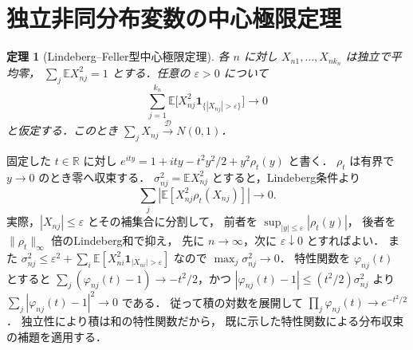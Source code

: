\documentclass[a5paper,10pt,onecolumn]{jsarticle}
\makeatletter
\theoremstyle{mathnotetheorem}
\newtheorem{theorem}{定理}[section]
\renewcommand{\proofname}{証明}
\renewenvironment{proof}[1][\proofname]{%
  \par\pushQED{\qed}\normalfont\topsep4\p@\@plus2\p@\relax
  \trivlist\item[\hskip\labelsep\bfseries #1]\ignorespaces
}{\popQED\endtrivlist\@endpefalse}
\newcommand{\norm}[1]{\lVert #1\rVert}
\makeatother
\begin{document}
\section{独立非同分布変数の中心極限定理}
\begin{theorem}[Lindeberg--Feller型中心極限定理]
各 $n$ に対し $X_{n1},\ldots,X_{nk_n}$ は独立で平均零，
$\sum_j\mathbb E X_{nj}^2=1$ とする．任意の $\varepsilon>0$ について
\[
 \sum_{j=1}^{k_n}\mathbb E\bigl[X_{nj}^2
 \mathbf1_{\{|X_{nj}|>\varepsilon\}}\bigr]
 \longrightarrow0
\]
と仮定する．このとき $\sum_jX_{nj}\xrightarrow{\mathcal D}N(0,1)$．
\end{theorem}
\begin{proof}
固定した $t\in\mathbb R$ に対し
$e^{ity}=1+ity-t^2y^2/2+y^2\rho_t(y)$ と書く．
$\rho_t$ は有界で $y\to0$ のとき零へ収束する．
$\sigma_{nj}^2=\mathbb E X_{nj}^2$ とすると，Lindeberg条件より
\[
 \sum_j\left|\mathbb E[X_{nj}^2\rho_t(X_{nj})]\right|\to0.
\]
実際，$|X_{nj}|\le\varepsilon$ とその補集合に分割して，
前者を $\sup_{|y|\le\varepsilon}|\rho_t(y)|$，
後者を $\norm{\rho_t}_\infty$ 倍のLindeberg和で抑え，
先に $n\to\infty$，次に $\varepsilon\downarrow0$ とすればよい．
また $\sigma_{nj}^2\le\varepsilon^2+
\sum_i\mathbb E[X_{ni}^2\mathbf1_{|X_{ni}|>\varepsilon}]$ なので
$\max_j\sigma_{nj}^2\to0$．
特性関数を $\varphi_{nj}(t)$ とすると
$\sum_j(\varphi_{nj}(t)-1)\to-t^2/2$，かつ
$|\varphi_{nj}(t)-1|\le(t^2/2)\sigma_{nj}^2$ より
$\sum_j|\varphi_{nj}(t)-1|^2\to0$ である．
従って積の対数を展開して
$\prod_j\varphi_{nj}(t)\to e^{-t^2/2}$．
独立性により積は和の特性関数だから，
既に示した特性関数による分布収束の補題を適用する．
\end{proof}
\end{document}
